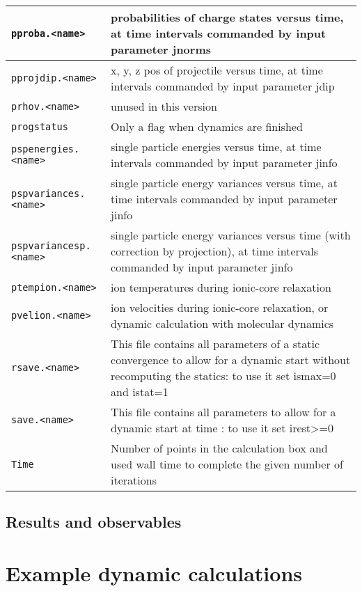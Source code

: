\documentclass[11pt,a4paper]{article}
\begin{document}
\begin{table}[t]
\begin{tabular}{|p{4.5cm}|p{10.2cm}|}
					\hline
					\texttt{pproba.<name>} & probabilities of charge states versus time, at time intervals commanded by input parameter jnorms\\
					\hline
					\texttt{pprojdip.<name>} & x, y, z pos of projectile versus time, at time intervals commanded by input parameter jdip\\
					\hline
					\texttt{prhov.<name>} & unused in this version\\
					\hline
					\texttt{progstatus} & Only a flag when dynamics are finished\\
					\hline
					\texttt{pspenergies.<name>} & single particle energies versus time, at time intervals commanded by input parameter jinfo\\
					\hline
					\texttt{pspvariances.<name>} & single particle energy variances versus time, at time intervals commanded by input parameter jinfo\\
					\hline
					\texttt{pspvariancesp.<name>} & single particle energy variances versus time (with correction by projection), at time intervals commanded by input parameter jinfo \\
					\hline
					\texttt{ptempion.<name>} & ion temperatures during ionic-core relaxation\\
					\hline
					\texttt{pvelion.<name>} & ion velocities during ionic-core relaxation, or dynamic calculation with molecular dynamics\\
					\hline
					\texttt{rsave.<name>} & This file contains all parameters of a static convergence to allow for a dynamic start without recomputing the statics: to use it set ismax=0 and istat=1  \\
					\hline
					\texttt{save.<name>} & This file contains all parameters to allow for a dynamic start at time : to use it set  irest>=0 \\
					\hline
					\texttt{Time} & Number of points in the calculation box and used wall time to complete the given number of iterations\\
					\hline
				\end{tabular}
			\end{table}

		\subsection{Results and observables}
			
	\section{Example dynamic calculations}
\end{document}
